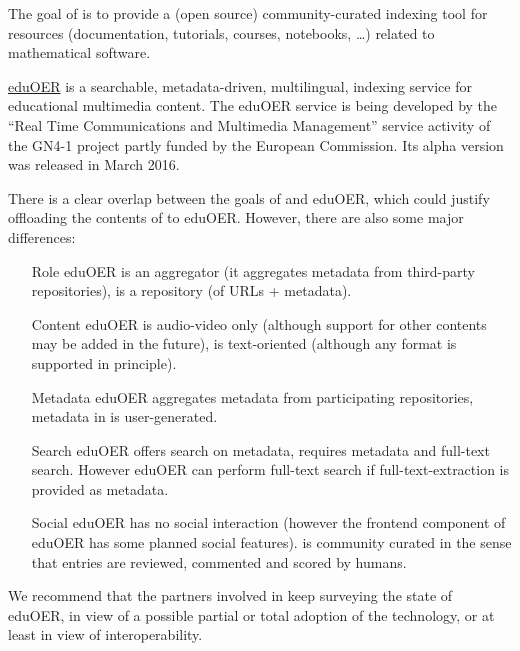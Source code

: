 \documentclass{deliverablereport}
\begin{document}
The goal of  is to provide a (open source)
community-curated indexing tool for resources (documentation,
tutorials, courses, notebooks, \dots) related to mathematical software.

\href{https://oer.geant.org/}{eduOER} is a searchable,
metadata-driven, multilingual, indexing service for educational
multimedia content. The eduOER service is being developed by the
``Real Time Communications and Multimedia Management'' service
activity of the GN4-1 project partly funded by the European
Commission. Its alpha version was released in March 2016.

There is a clear overlap between the goals of
 and eduOER, which could justify offloading
the contents of  to eduOER. However, there
are also some major differences:

\begin{itemize}
\item[Role] eduOER is an aggregator (it aggregates metadata from
  third-party repositories),  is a
  repository (of URLs + metadata).
\item[Content] eduOER is audio-video only (although support for other
  contents may be added in the future),  is
  text-oriented (although any format is supported in principle).
\item[Metadata] eduOER aggregates metadata from participating
  repositories, metadata in  is
  user-generated.
\item[Search] eduOER offers search on metadata,
   requires metadata and full-text
  search. However eduOER can perform full-text search if
  full-text-extraction is provided as metadata.
\item[Social] eduOER has no social interaction (however the frontend
  component of eduOER has some planned social
  features).  is community curated in the
  sense that entries are reviewed, commented and scored by humans.
\end{itemize}

We recommend that the partners involved in 
keep surveying the state of eduOER, in view of a possible partial or
total adoption of the technology, or at least in view of
interoperability.

\end{document}
